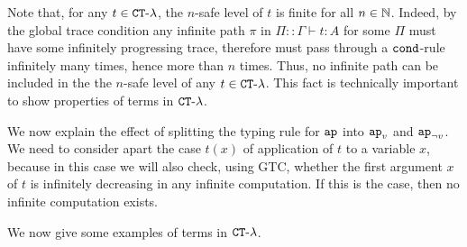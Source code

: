 Note that, for any $t\in{ {\tt CT}\mbox{-}\lambda}$, the $n$-safe level of $t$ is finite for all $n \in \mathbb{N}$. 
Indeed, by the global trace condition any infinite path $\pi$ in $\Pi::\Gamma\vdash t:A$ for some 
$\Pi$ must have some infinitely progressing trace, therefore must pass through a ${\tt cond}$-rule
infinitely many times, hence more than $n$ times. Thus, no infinite path can be included in the
the $n$-safe level of any $t\in{ {\tt CT}\mbox{-}\lambda}$.
This fact is technically important to show properties of terms in ${ {\tt CT}\mbox{-}\lambda}$. 


\begin{remark}
We now explain the effect of splitting the typing rule for ${\tt ap}$ into $\apvar$ and $\apnotvar$.
We need to consider apart the case $t(x)$ of application of $t$ to a variable
$x$, because in this case we will also check, using GTC, 
whether the first argument $x$ of $t$ is infinitely decreasing in any infinite 
computation. If this is the case, then no infinite computation exists. 
\end{remark}

We now give some examples of terms in ${ {\tt CT}\mbox{-}\lambda}$. 



